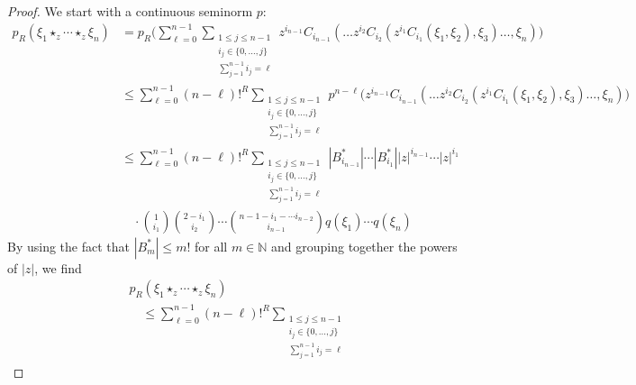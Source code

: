 \begin{proof}
    We start with a continuous seminorm $p$:
    \begin{align}
        \nonumber
        p_R \left(
            \xi_1 \star_z \cdots \star_z \xi_n
        \right)
        & =
        p_R \Bigg(
        \sum\limits_{\ell = 0}^{n-1}
        \sum\limits_{\substack{
			1 \leq j \leq n-1 \\
			i_j \in \{0, \ldots, j\} \\
			\sum_{j = 1}^{n - 1} i_j = \ell
		}}
		z^{i_{n-1}}
		C_{i_{n-1}}
		\left(
			\ldots z^{i_2} C_{i_2}
			\left(
				z^{i_1} C_{i_1}
				\left( \xi_1, \xi_2 \right)
				, \xi_3
			\right)
			\ldots, \xi_n
		\right)
        \Bigg)
        \\
        \nonumber
        & \leq
        \sum\limits_{\ell = 0}^{n-1}
        (n - \ell)!^R
        \sum\limits_{\substack{
			1 \leq j \leq n-1 \\
			i_j \in \{0, \ldots, j\} \\
			\sum_{j = 1}^{n - 1} i_j = \ell
		}}
        p^{n - \ell} \Big(
		z^{i_{n-1}}
		C_{i_{n-1}}
		\left(
			\ldots z^{i_2} C_{i_2}
			\left(
				z^{i_1} C_{i_1}
				\left( \xi_1, \xi_2 \right)
				, \xi_3
			\right)
			\ldots, \xi_n
		\right)
		\Big)
        \\
        \nonumber
        & \leq
        \sum\limits_{\ell = 0}^{n-1}
        (n - \ell)!^R
        \sum\limits_{\substack{
			1 \leq j \leq n-1 \\
			i_j \in \{0, \ldots, j\} \\
			\sum_{j = 1}^{n - 1} i_j = \ell
		}}
        |B_{i_{n-1}}^*| \cdots |B_{i_1}^*|
        |z|^{i_{n-1}} \cdots |z|^{i_1}
        \\
        \label{LCAna:PreContinuityIntermediateN}
        & \quad \cdot
        \binom{1}{i_1} \binom{2 - i_1}{i_2}
        \cdots
        \binom{n - 1 - i_1 - \cdots i_{n-2}}{i_{n-1}}
        q(\xi_1) \cdots q(\xi_n)
    \end{align}
    By using the fact that $|B_m^*| \leq m!$ for all $m \in
    \mathbb{N}$ and grouping together the powers of $|z|$, we find
    \begin{align*}
        &p_R \left(
            \xi_1 \star_z \cdots \star_z \xi_n
        \right) \\
        &\quad\leq
        \sum\limits_{\ell = 0}^{n-1}
        (n - \ell)!^R
        \sum\limits_{\substack{
			1 \leq j \leq n-1 \\
			i_j \in \{0, \ldots, j\} \\
			\sum_{j = 1}^{n - 1} i_j = \ell
}}
\end{align*}
\end{proof}
